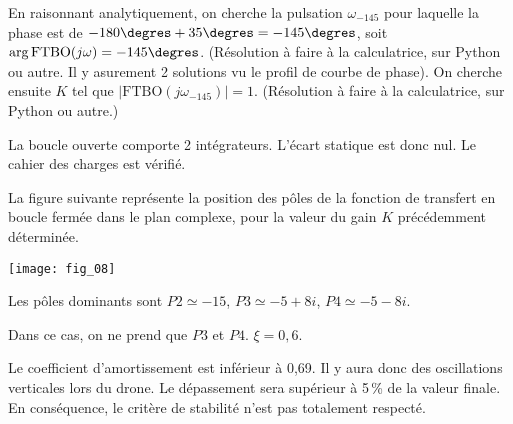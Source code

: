 \begin{multicols}{2}
\begin{corrige}
\end{corrige}
\else
\fi


\ifprof
\begin{corrige}
En raisonnant analytiquement, on cherche la pulsation $\omega_{-145}$ pour laquelle la phase est de $-180\degres+35\degres = -145\degres$, soit $\arg{\text{FTBO}(j\omega)}=-145\degres$. (Résolution à faire à la calculatrice, sur Python ou autre. Il y asurement 2 solutions vu le profil de courbe de phase). 
On cherche ensuite $K$ tel que $\left| \text{FTBO}(j\omega_{-145}) \right| = 1$. 
(Résolution à faire à la calculatrice, sur Python ou autre.)
\end{corrige}
\else
\fi

\ifprof
\begin{corrige}
La boucle ouverte comporte 2 intégrateurs. L'écart statique est donc nul. Le cahier des charges est vérifié. 

\end{corrige}
\else
\fi

\ifprof
\else

La figure suivante représente la position des pôles de la fonction de transfert en boucle fermée dans le plan
complexe, pour la valeur du gain $K$ précédemment déterminée.


\begin{center}
\texttt{[image: fig\_08]}
\end{center}
\fi


\ifprof
\begin{corrige}
Les pôles dominants sont $P2\simeq -15$, $P3 \simeq -5 +8i$, $P4\simeq -5 -8i$. 
\end{corrige}
\else
\fi

\ifprof
\begin{corrige}
Dans ce cas, on ne prend que $P3$ et $P4$. $\xi=0,6$. 
\end{corrige}
\else
\fi

\ifprof
\begin{corrige}
Le coefficient d'amortissement est inférieur à 0,69. Il y aura donc des oscillations verticales lors du drone. Le dépassement sera supérieur à 5\,\% de la valeur finale.  En conséquence, le critère de stabilité n'est pas totalement respecté. 
\end{corrige}
\else
\fi


\end{multicols}
